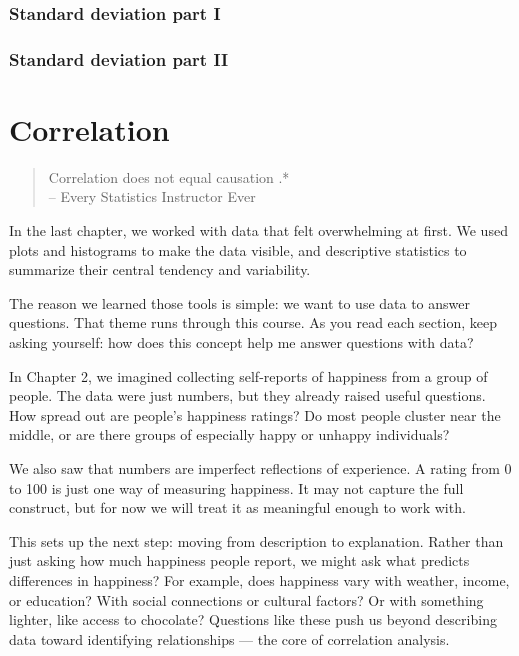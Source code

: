 \documentclass[
  letterpaper,
  DIV=11,
  numbers=noendperiod]{scrreprt}
\begin{document}
\subsection{Standard deviation part I}\label{standard-deviation-part-i}

\subsection{Standard deviation part
II}\label{standard-deviation-part-ii}


\chapter{Correlation}\label{Correlation}

\begin{quote}
Correlation does not equal causation .*\\
-- Every Statistics Instructor Ever
\end{quote}

In the last chapter, we worked with data that felt overwhelming at
first. We used plots and histograms to make the data visible, and
descriptive statistics to summarize their central tendency and
variability.

The reason we learned those tools is simple: we want to use data to
answer questions. That theme runs through this course. As you read each
section, keep asking yourself: how does this concept help me answer
questions with data?

In Chapter 2, we imagined collecting self-reports of happiness from a
group of people. The data were just numbers, but they already raised
useful questions. How spread out are people's happiness ratings? Do most
people cluster near the middle, or are there groups of especially happy
or unhappy individuals?

We also saw that numbers are imperfect reflections of experience. A
rating from 0 to 100 is just one way of measuring happiness. It may not
capture the full construct, but for now we will treat it as meaningful
enough to work with.

This sets up the next step: moving from description to explanation.
Rather than just asking how much happiness people report, we might ask
what predicts differences in happiness? For example, does happiness vary
with weather, income, or education? With social connections or cultural
factors? Or with something lighter, like access to chocolate? Questions
like these push us beyond describing data toward identifying
relationships --- the core of correlation analysis.
\end{document}
